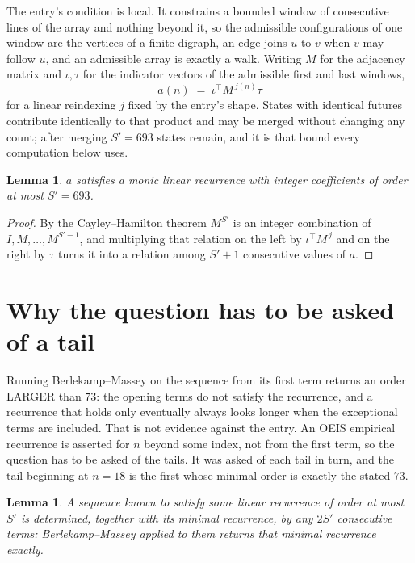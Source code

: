 \documentclass[11pt,a4paper]{article}
\theoremstyle{plain}
\newtheorem{lemma}[theorem]{Lemma}
\theoremstyle{definition}
\begin{document}
The entry's condition is local. It constrains a bounded window of consecutive lines of the
array and nothing beyond it, so the admissible configurations of one window are the vertices of
a finite digraph, an edge joins $u$ to $v$ when $v$ may follow $u$, and an admissible array is
exactly a walk. Writing $M$ for the adjacency matrix and $\iota,\tau$ for the indicator vectors
of the admissible first and last windows,
\[
a(n)\;=\;\iota^{\!\top}M^{\,j(n)}\tau
\]
for a linear reindexing $j$ fixed by the entry's shape. States with identical futures
contribute identically to that product and may be merged without changing any count; after
merging $S'=693$ states remain, and it is that bound every computation below uses.

\begin{lemma}\label{lem:cf}
$a$ satisfies a monic linear recurrence with integer coefficients of order at most $S'=693$.
\end{lemma}

\begin{proof}
By the Cayley--Hamilton theorem $M^{S'}$ is an integer combination of $I,M,\dots,M^{S'-1}$,
and multiplying that relation on the left by $\iota^{\!\top}M^{\,j}$ and on the right by
$\tau$ turns it into a relation among $S'+1$ consecutive values of $a$.
\end{proof}

\section{Why the question has to be asked of a tail}

Running Berlekamp--Massey on the sequence from its first term returns an order LARGER than $73$: the opening terms do not satisfy the recurrence, and a recurrence that holds only eventually always looks longer when the exceptional terms are included. That is not evidence against the entry. An OEIS empirical recurrence is asserted for $n$ beyond some index, not from the first term, so the question has to be asked of the tails. It was asked of each tail in turn, and the tail beginning at $n=18$ is the first whose minimal order is exactly the stated $73$.

\begin{lemma}\label{lem:bm}
A sequence known to satisfy some linear recurrence of order at most $S'$ is determined,
together with its minimal recurrence, by any $2S'$ consecutive terms: Berlekamp--Massey applied
to them returns that minimal recurrence exactly.
\end{lemma}
\end{document}

